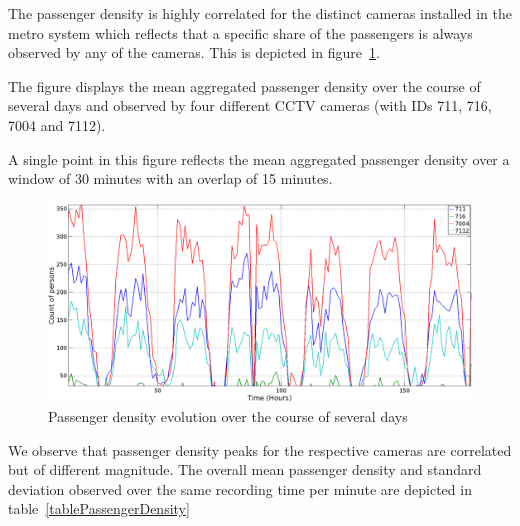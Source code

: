 The passenger density is highly correlated for the distinct cameras installed in the metro system which reflects that a specific share of the passengers is always observed by any of the cameras.
This is depicted in figure~\ref{figureHours}.

The figure displays the mean aggregated passenger density over the course of several days and observed by four different CCTV cameras (with IDs 711, 716, 7004 and 7112).

A single point in this figure reflects the mean aggregated passenger density over a window of 30 minutes with an overlap of 15 minutes.
\begin{figure}
\begin{center}
 \includegraphics[height=.5\columnwidth]{Figures/Figure_PersonCount_Hours.png}
 \caption{Passenger density evolution over the course of several days}
  \label{figureHours}
  \end{center}
\end{figure}

We observe that passenger density peaks for the respective cameras are correlated but of different magnitude. 
The overall mean passenger density and standard deviation observed over the same recording time per minute are depicted in table~\ref{tablePassengerDensity}

